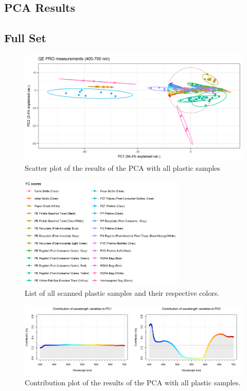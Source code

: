 \begin{appendices}
\chapter{PCA Results}
\label{app:PCA_res_full}
\section{Full Set}
\begin{figure}[H]
    \centering
    \includegraphics[width=1\textwidth]{Images/results/PCA_plastics_full_only_scat.png}
    \caption[PCA Full Set]{Scatter plot of the results of the PCA with all plastic samples}
\end{figure}

\begin{figure}[H]
   \centering
    \includegraphics[width=0.7\textwidth]{Images/results/PCA_plastics_full_list.png}
  \caption[PCA Full Set List]{List of all scanned plastic samples and their respective colors.}
\end{figure}

\begin{figure}[H]
    \centering
    \includegraphics[width=1\textwidth]{Images/results/PCA_plastics_full_doub_cont.png}
    \caption[Contribution Plot Full Set]{Contribution plot of the results of the PCA with all plastic samples.}
\end{figure}


\end{appendices}
